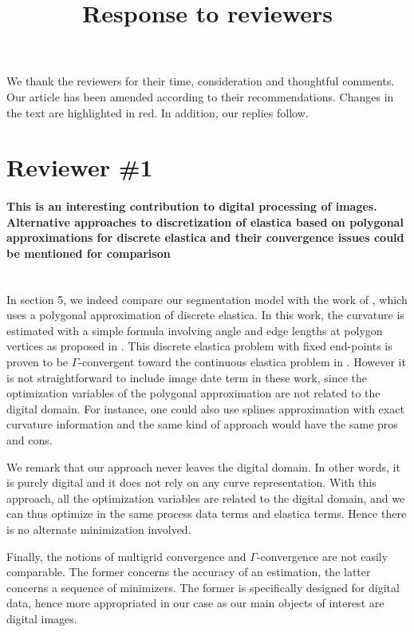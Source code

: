 \documentclass[12pt]{article}
\title{Response to reviewers}
\date{}
\begin{document}
\maketitle

We thank the reviewers for their time, consideration and thoughtful comments. Our article has been amended
according to their recommendations. Changes in the text are highlighted in red. In addition, our replies follow.

\section{Reviewer \#1}

\paragraph{This is an interesting contribution to digital processing of images. Alternative approaches to discretization of elastica based on polygonal approximations for discrete elastica and their convergence issues could be mentioned for comparison}

~\\ In section 5, we indeed compare our segmentation model with the
work of \cite{schoenemann09linear}, which uses a polygonal
approximation of discrete elastica. In this work, the curvature is
estimated with a simple formula involving angle and edge lengths at
polygon vertices as proposed in \cite{bruckstein96}. This discrete
elastica problem with fixed end-points is proven to be
$\Gamma$-convergent toward the continuous elastica problem in
\cite{bruckstein01}. However it is not straightforward to include
image date term in these work, since the optimization variables of the
polygonal approximation are not related to the digital domain. For
instance, one could also use splines approximation with exact
curvature information and the same kind of approach would have the
same pros and cons.

We remark that our approach never leaves the digital domain. In other
words, it is purely digital and it does not rely on any curve
representation. With this approach, all the optimization variables are
related to the digital domain, and we can thus optimize in the same
process data terms and elastica terms. Hence there is no alternate
minimization involved.

Finally, the notions of multigrid convergence and $\Gamma$-convergence
are not easily comparable. The former concerns the accuracy of an
estimation, the latter concerns a sequence of minimizers. The former
is specifically designed for digital data, hence more appropriated in
our case as our main objects of interest are digital images.  ~\\
\end{document}
